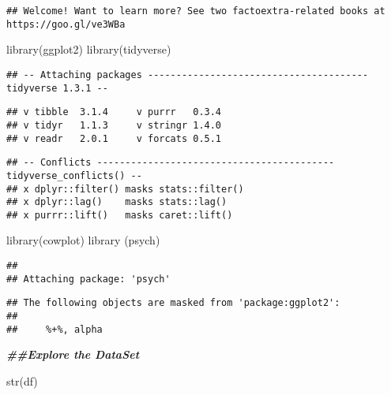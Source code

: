 \documentclass[
]{article}
\newenvironment{Shaded}{\begin{snugshade}}{\end{snugshade}}
\newcommand{\DocumentationTok}[1]{\textcolor[rgb]{0.56,0.35,0.01}{\textbf{\textit{#1}}}}
\newcommand{\FunctionTok}[1]{\textcolor[rgb]{0.00,0.00,0.00}{#1}}
\newcommand{\NormalTok}[1]{#1}
\begin{document}
\begin{verbatim}
## Welcome! Want to learn more? See two factoextra-related books at https://goo.gl/ve3WBa
\end{verbatim}

\begin{Shaded}
\begin{Highlighting}[]
\FunctionTok{library}\NormalTok{(ggplot2)}
\FunctionTok{library}\NormalTok{(tidyverse)}
\end{Highlighting}
\end{Shaded}

\begin{verbatim}
## -- Attaching packages --------------------------------------- tidyverse 1.3.1 --
\end{verbatim}

\begin{verbatim}
## v tibble  3.1.4     v purrr   0.3.4
## v tidyr   1.1.3     v stringr 1.4.0
## v readr   2.0.1     v forcats 0.5.1
\end{verbatim}

\begin{verbatim}
## -- Conflicts ------------------------------------------ tidyverse_conflicts() --
## x dplyr::filter() masks stats::filter()
## x dplyr::lag()    masks stats::lag()
## x purrr::lift()   masks caret::lift()
\end{verbatim}

\begin{Shaded}
\begin{Highlighting}[]
\FunctionTok{library}\NormalTok{(cowplot)}
\FunctionTok{library}\NormalTok{ (psych)}
\end{Highlighting}
\end{Shaded}

\begin{verbatim}
## 
## Attaching package: 'psych'
\end{verbatim}

\begin{verbatim}
## The following objects are masked from 'package:ggplot2':
## 
##     %+%, alpha
\end{verbatim}

\begin{Shaded}
\begin{Highlighting}[]
\DocumentationTok{\#\#Explore the DataSet }

\FunctionTok{str}\NormalTok{(df)}
\end{Highlighting}
\end{Shaded}
\end{document}
